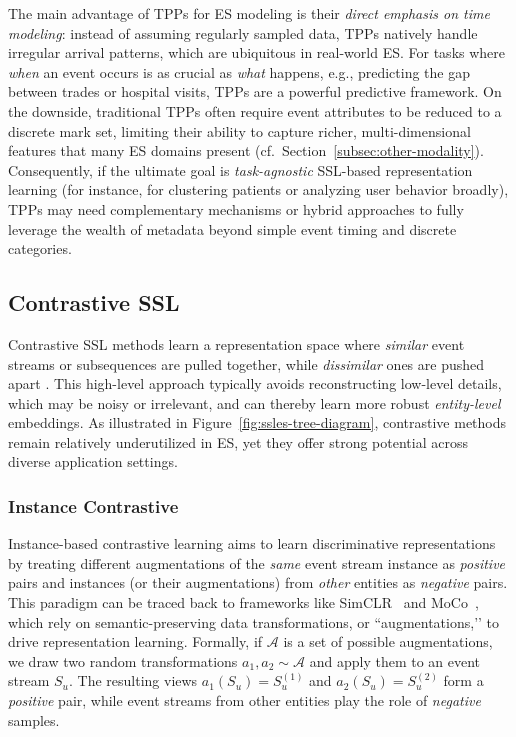 \documentclass[twoside,11pt]{article}
\begin{document}
The main advantage of TPPs for ES modeling is their {\it direct emphasis on time modeling}: instead of assuming regularly sampled data, TPPs natively handle irregular arrival patterns, which are ubiquitous in real-world ES. For tasks where {\it when} an event occurs is as crucial as {\it what} happens, e.g., predicting the gap between trades or hospital visits, TPPs are a powerful predictive framework.
On the downside, traditional TPPs often require event attributes to be reduced to a discrete mark set, limiting their ability to capture richer, multi-dimensional features that many ES domains present (cf.~Section~\ref{subsec:other-modality}). Consequently, if the ultimate goal is {\it task-agnostic} SSL-based representation learning (for instance, for clustering patients or analyzing user behavior broadly), TPPs may need complementary mechanisms or hybrid approaches to fully leverage the wealth of metadata beyond simple event timing and discrete categories.

\subsection{Contrastive SSL}
\label{subsec:contrastive-ssl}

Contrastive SSL methods learn a representation space where \emph{similar} event streams or subsequences are pulled together, while \emph{dissimilar} ones are pushed apart . This high-level approach typically avoids reconstructing low-level details, which may be noisy or irrelevant, and can thereby learn more robust \emph{entity-level} embeddings. As illustrated in Figure~\ref{fig:ssles-tree-diagram}, contrastive methods remain relatively underutilized in ES, yet they offer strong potential across diverse application settings.

\subsubsection{Instance Contrastive}
\label{subsubsec:instance-contrastive}

Instance-based contrastive learning aims to learn discriminative representations by treating different augmentations of the \emph{same} event stream instance as \emph{positive} pairs and instances (or their augmentations) from \emph{other} entities as \emph{negative} pairs. This paradigm can be traced back to frameworks like SimCLR~ and MoCo~, which rely on semantic-preserving data transformations, or ``augmentations,’’ to drive representation learning. Formally, if $\mathcal{A}$ is a set of possible augmentations, we draw two random transformations $a_1, a_2 \sim \mathcal{A}$ and apply them to an event stream $S_u$. The resulting views $a_1(S_u) = {S}^{(1)}_u$ and $a_2(S_u) = S^{(2)}_u$ form a {\it positive} pair, while event streams from other entities play the role of {\it negative} samples.
\end{document}
